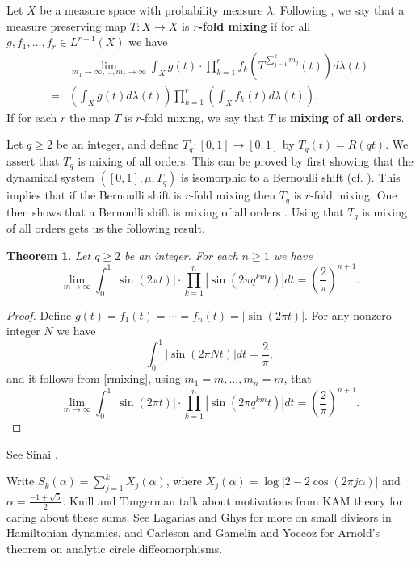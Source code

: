 \documentclass{article}
\newtheorem{theorem}{Theorem}
\begin{document}
Let $X$ be a measure space with probability measure $\lambda$. Following  \cite[p.~21, Definition 3.6]{EMS}, we say that a measure preserving map $T:X \to X$ is \textbf{$r$-fold mixing}
if for all $g,f_1,\ldots,f_r \in L^{r+1}(X)$ we have 
\begin{equation}
\begin{split}
&\lim_{m_1 \to \infty,\ldots,m_r \to \infty} \int_X g(t) \cdot \prod_{k=1}^r f_k\left(T^{\sum_{j=1}^k m_j}(t)\right) d\lambda(t)\\
=&\left(\int_X g(t) d\lambda(t)\right) \prod_{k=1}^r \left( \int_X f_k(t) d\lambda(t) \right).
\end{split}
\label{rmixing}
\end{equation}
If for each $r$ the map $T$ is $r$-fold mixing, we say that $T$ is \textbf{mixing of all orders}.

Let $q \geq 2$ be an integer, and define $T_q:[0,1] \to [0,1]$ by 
$T_q(t)=R(qt)$. We assert that $T_q$ is mixing of all orders. This can be proved by first showing that
the dynamical system $([0,1],\mu,T_q)$ is  isomorphic to a Bernoulli shift (cf. \cite[p.~17, Example 2.8]{einsiedler}). This implies that if the Bernoulli shift is $r$-fold mixing then
$T_q$ is $r$-fold mixing. One then shows that a Bernoulli shift is mixing of all orders \cite[p.~53, Exercise 2.7.9]{einsiedler}. Using that $T_q$ is mixing of all orders gets us the following result.

\begin{theorem}
Let $q \geq 2$ be an integer. For each $n \geq 1$ we have
\[
\lim_{m \to \infty} \int_0^1 |\sin(2\pi t)| \cdot \prod_{k=1}^n \left| \sin\left(2\pi q^{km} t\right) \right|  dt
= \left( \frac{2}{\pi} \right)^{n+1}.
\]
\end{theorem}
\begin{proof}
Define
$g(t)=f_1(t)=\cdots=f_n(t)=|\sin(2\pi t)|$. For any nonzero integer $N$ we have
\[
\int_0^1 |\sin(2\pi N t)| dt=\frac{2}{\pi},
\]
and it follows from \eqref{rmixing}, using $m_1=m, \ldots, m_n=m$, that
\[
\lim_{m \to \infty} \int_0^1 |\sin(2\pi t)| \cdot \prod_{k=1}^n \left| \sin\left(2\pi q^{km} t\right) \right|  dt
= \left( \frac{2}{\pi} \right)^{n+1}.
\]
\end{proof}

See Sinai \cite{Sinai1994}.

Write
$S_k(\alpha)=\sum_{j=1}^k X_j(\alpha)$, where $X_j(\alpha)=\log|2-2\cos(2\pi j\alpha)|$ and
$\alpha=\frac{-1+\sqrt{5}}{2}$. 
Knill and Tangerman \cite{tangerman} 
talk about  motivations from KAM theory for caring about these sums. See Lagarias \cite{lagarias} and Ghys \cite{ghys} for more on small divisors in Hamiltonian dynamics, 
and Carleson and Gamelin \cite[p.~48, Theorem 7.2]{carleson} and Yoccoz \cite{yoccoz} for Arnold's theorem on analytic circle diffeomorphisms.
\end{document}
